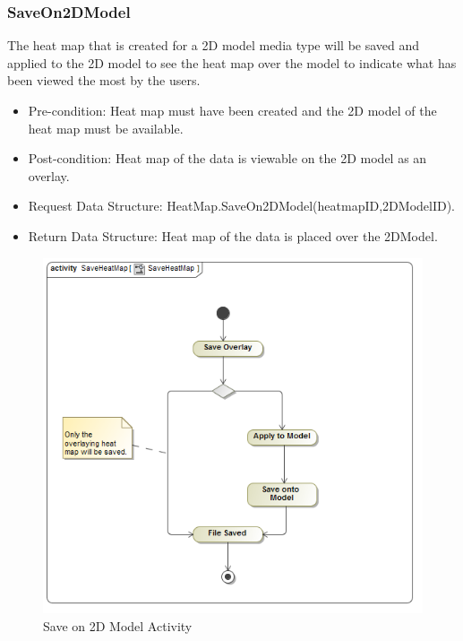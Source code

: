 	\subsubsection{SaveOn2DModel}
The heat map that is created for a 2D model media type will be saved and applied to the 2D model to see the heat map over the model to indicate what has been viewed the most by the users.
	\begin{itemize}
		\item Pre-condition: Heat map must have been created and the 2D model of the heat map must be available.
		\item Post-condition: Heat map of the data is viewable on the 2D model as an overlay.
		\item Request Data Structure: HeatMap.SaveOn2DModel(heatmapID,2DModelID).
		\item Return Data Structure: Heat map of the data is placed over the 2DModel.
	\end{itemize}
	\begin{figure}[!ht]
		\centering	
		\includegraphics[scale=0.5]{Diagrams/Activity_Diagram__SaveHeatMap__SaveHeatMap.png}	
		\caption{Save on 2D Model Activity}
	\end{figure}

